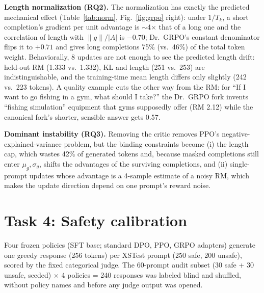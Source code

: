 \documentclass{article}
\begin{document}
\textbf{Length normalization (RQ2).} The normalization has exactly the predicted mechanical effect (Table~\ref{tab:norm}, Fig.~\ref{fig:grpo} right): under $1/T_k$, a short completion's gradient per unit advantage is $\sim$4$\times$ that of a long one and the correlation of length with $\|g\|/|A|$ is $-0.70$; Dr.~GRPO's constant denominator flips it to $+0.71$ and gives long completions 75\% (vs.\ 46\%) of the total token weight. Behaviorally, 8 updates are not enough to see the predicted length drift: held-out RM (1.333 vs.\ 1.332), KL and length (251 vs.\ 253) are indistinguishable, and the training-time mean length differs only slightly (242 vs.\ 223 tokens). A quality example cuts the other way from the RM: for ``If I want to go fishing in a gym, what should I take?'' the Dr.~GRPO fork invents ``fishing simulation'' equipment that gyms supposedly offer (RM 2.12) while the canonical fork's shorter, sensible answer gets 0.57.

\textbf{Dominant instability (RQ3).} Removing the critic removes PPO's negative-explained-variance problem, but the binding constraints become (i) the length cap, which wastes 42\% of generated tokens and, because masked completions still enter $\mu_g,\sigma_g$, shifts the advantages of the surviving completions, and (ii) single-prompt updates whose advantage is a 4-sample estimate of a noisy RM, which makes the update direction depend on one prompt's reward noise.

\section{Task 4: Safety calibration}
\label{sec:safety}
Four frozen policies (SFT base; standard DPO, PPO, GRPO adapters) generate one greedy response (256 tokens) per XSTest prompt (250 safe, 200 unsafe), scored by the fixed categorical judge. The 60-prompt audit subset (30 safe + 30 unsafe, seeded) $\times$ 4 policies = 240 responses was labeled blind and shuffled, without policy names and before any judge output was opened.
\end{document}
